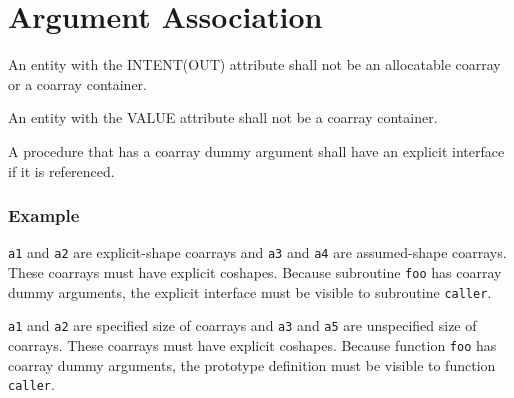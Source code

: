 \section{Argument Association}
\label{sec:Argument Association}

\begin{Constraints F}
\item An entity with the INTENT(OUT) attribute shall not be
an allocatable coarray or a coarray container.

\item An entity with the VALUE attribute shall not be a 
coarray container. %

\item A procedure that has a coarray dummy argument 
shall have an explicit interface if it is referenced. %

\end{Constraints F}


\subsubsection*{Example}

{\onlyF}
{\tt a1} and {\tt a2} are explicit-shape coarrays and
{\tt a3} and {\tt a4} are assumed-shape coarrays.
These coarrays must have explicit coshapes.
Because subroutine {\tt foo} has coarray dummy arguments,
the explicit interface must be visible to subroutine {\tt caller}.

{\onlyC}
{\tt a1} and {\tt a2} are specified size of coarrays and
{\tt a3} and {\tt a5} are unspecified size of coarrays.
These coarrays must have explicit coshapes.
Because function {\tt foo} has coarray dummy arguments,
the prototype definition must be visible to function {\tt caller}.

